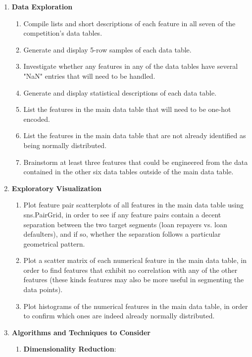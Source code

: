 \documentclass[12pt, letterpaper]{article}
\begin{document}
\renewcommand{\labelenumi}{\Roman{enumi}}
\begin{enumerate}
  \item \textbf{Data Exploration}
    \begin{enumerate}
      \item Compile lists and short descriptions of each feature in all seven of the competition's data tables.
      \item Generate and display 5-row samples of each data table.
      \item Investigate whether any features in any of the data tables have several "NaN" entries that will need to be handled.
      \item Generate and display statistical descriptions of each data table.
      \item List the features in the main data table that will need to be one-hot encoded.
      \item List the features in the main data table that are not already identified as being normally distributed.
      \item Brainstorm at least three features that could be engineered from the data contained in the other six data tables outside of the main data table.
    \end{enumerate}
  \item \textbf{Exploratory Visualization}
    \begin{enumerate}
      \item Plot feature pair scatterplots of all features in the main data table using sns.PairGrid, in order to see if any feature pairs contain a decent separation between the two target segments (loan repayers vs. loan defaulters), and if so, whether the separation follows a particular geometrical pattern.
      \item Plot a scatter matrix of each numerical feature in the main data table, in order to find features that exhibit no correlation with any of the other features (these kinds features may also be more useful in segmenting the data points).
      \item Plot histograms of the numerical features in the main data table, in order to confirm which ones are indeed already normally distributed.
    \end{enumerate}
  \item \textbf{Algorithms and Techniques to Consider}
    \begin{enumerate}
      \item \textbf{Dimensionality Reduction}:

\end{enumerate}
\end{enumerate}
\end{document}
